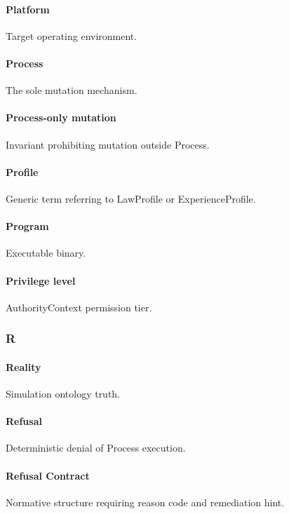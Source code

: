 \documentclass[9pt,a4paper,openany]{book}
\begin{document}
\paragraph{Platform}
Target operating environment.\allowbreak{}


\paragraph{Process}
The sole mutation mechanism.\allowbreak{}


\paragraph{Process-only mutation}
Invariant prohibiting mutation outside Process.\allowbreak{}


\paragraph{Profile}
Generic term referring to LawProfile or ExperienceProfile.\allowbreak{}


\paragraph{Program}
Executable binary.\allowbreak{}


\paragraph{Privilege level}
AuthorityContext permission tier.\allowbreak{}


\subsubsection{R}

\paragraph{Reality}
Simulation ontology truth.\allowbreak{}


\paragraph{Refusal}
Deterministic denial of Process execution.\allowbreak{}


\paragraph{Refusal Contract}
Normative structure requiring reason code and remediation hint.\allowbreak{}
\end{document}
